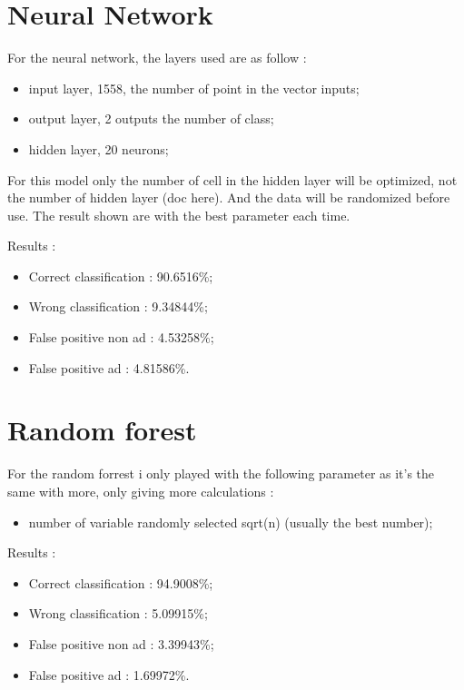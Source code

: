 \section{Neural Network}
For the neural network, the layers used are as follow :
  \begin{itemize}
    \item input layer, 1558, the number of point in the vector inputs;
    \item output layer, 2 outputs the number of class;
    \item hidden layer, 20 neurons;
  \end{itemize}

 For this model only the number of cell in the hidden layer will be optimized, not the number of hidden layer (doc here). And the data will be randomized before use. The result shown are with the best parameter each time.

  Results :
  \begin{itemize}
    \item Correct classification : 90.6516\%;
    \item Wrong classification : 9.34844\%;
    \item False positive non ad : 4.53258\%;
    \item False positive ad : 4.81586\%.
  \end{itemize}


\section{Random forest}
For the random forrest i only played with the following parameter as it's the same with more, only giving more calculations :
  \begin{itemize}
    \item number of variable randomly selected sqrt(n) (usually the best number);
  \end{itemize}
Results :
\begin{itemize}
  \item Correct classification : 94.9008\%;
  \item Wrong classification : 5.09915\%;
  \item False positive non ad : 3.39943\%;
  \item False positive ad : 1.69972\%.
\end{itemize}
